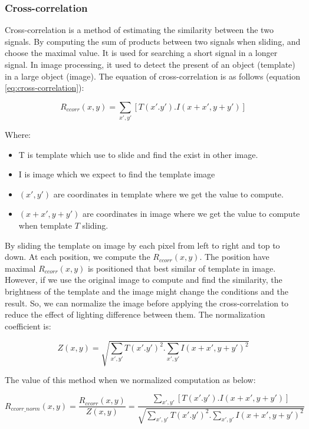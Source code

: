 \subsubsection{Cross-correlation}
Cross-correlation is a method of estimating the similarity between the two signals. By computing the sum of products between two signals when sliding, and choose the maximal value. It is used for searching a short signal in a longer signal. In image processing, it used to detect the present of an object (template) in a large object (image). The equation of cross-correlation is as follows (equation \ref{eq:cross-correlation}):
\begin{center}
\begin{equation}\label{eq:cross-correlation}
R_{ccorr}(x,y) = \sum\limits_{x',y'}[T(x'.y').I(x + x', y + y')]
\end{equation}
\end{center}
Where:
\begin{itemize}
\item T is template which use to slide and find the exist in other image.
\item I is image which we expect to find the template image
\item $(x', y')$ are coordinates in template where we get the value to compute.
\item $(x + x', y + y')$ are coordinates in image where we get the value to compute when template $T$ sliding.
\end{itemize}
By sliding the template on image by each pixel from left to right and top to down. At each position, we compute the $R_{ccorr}(x,y)$. The position have maximal $R_{ccorr}(x,y)$ is positioned that best similar of template in image.\\[0.2cm]
However, if we use the original image to compute and find the similarity, the brightness of the template and the image might change the conditions and the result. So, we can normalize the image before applying the cross-correlation to reduce the effect of lighting difference between them. The normalization coefficient is:
\begin{center}
\begin{equation}\label{eq:normalizeCoff}
Z(x,y) = \sqrt{\sum\limits_{x',y'}T(x'.y')^{2}.\sum\limits_{x',y'}I(x + x', y + y')^{2}}
\end{equation}
\end{center}
The value of this method when we normalized computation as below:
\begin{center}
\begin{equation}\label{eq:cross-correlation}
R_{ccorr\_norm}(x,y) =\frac{R_{ccorr}(x,y)}{Z(x,y)} = \frac{\sum\limits_{x',y'}[T(x'.y').I(x + x', y + y')]}{\sqrt{\sum\limits_{x',y'}T(x'.y')^{2}.\sum\limits_{x',y'}I(x + x', y + y')^{2}}}
\end{equation}
\end{center}
